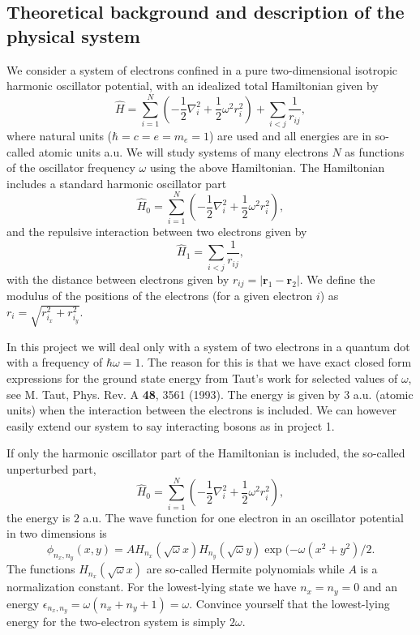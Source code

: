 \documentclass[%
oneside,                 %
final,                   %
10pt]{article}
\begin{document}
\subsection*{Theoretical background and description of the physical system}

We consider a system of electrons confined in a pure two-dimensional 
isotropic harmonic oscillator potential, with an idealized  total Hamiltonian given by
\begin{equation}
\label{eq:finalH}
\hat{H}=\sum_{i=1}^{N} \left(  -\frac{1}{2} \nabla_i^2 + \frac{1}{2} \omega^2r_i^2  \right)+\sum_{i<j}\frac{1}{r_{ij}},
\end{equation}
where natural units ($\hbar=c=e=m_e=1$) are used and all energies are in so-called atomic units a.u. We will study systems of many electrons $N$ as functions of the oscillator frequency  $\omega$ using the above Hamiltonian.  The Hamiltonian includes a standard harmonic oscillator part
\begin{equation*}
\hat{H}_0=\sum_{i=1}^{N} \left(  -\frac{1}{2} \nabla_i^2 + \frac{1}{2} \omega^2r_i^2  \right),
\end{equation*}
and the repulsive interaction between two electrons given by
\begin{equation*}
\hat{H}_1=\sum_{i<j}\frac{1}{r_{ij}},
\end{equation*}
with the distance between electrons given by $r_{ij}=\vert \bm{r}_1-\bm{r}_2\vert$. We define the 
modulus of the positions of the electrons (for a given electron $i$) as $r_i = \sqrt{r_{i_x}^2+r_{i_y}^2}$.

In this project  we will deal only with a system of
two electrons in a quantum dot with a frequency of $\hbar\omega = 1$. 
The reason for this is that we have exact closed form expressions 
for the ground state energy from Taut's work for selected values of $\omega$, 
see M. Taut, Phys. Rev. A \textbf{48}, 3561 (1993).
The energy is given by $3$ a.u.  (atomic units) when the interaction between the electrons is included. We can however easily extend our system to say interacting bosons as in project 1.

If only the harmonic oscillator part of the Hamiltonian is included,
the so-called unperturbed part,
\begin{equation*} 
\hat{H}_0=\sum_{i=1}^{N} \left(  -\frac{1}{2} \nabla_i^2 + \frac{1}{2} \omega^2r_i^2  \right),
\end{equation*}
the energy is $2$ a.u.
The wave function for one electron in an oscillator potential in two dimensions is
\begin{equation*}
\phi_{n_x,n_y}(x,y) = A H_{n_x}(\sqrt{\omega}x)H_{n_y}(\sqrt{\omega}y)\exp{(-\omega(x^2+y^2)/2}.
\end{equation*}
The functions $H_{n_x}(\sqrt{\omega}x)$ are so-called Hermite polynomials  while $A$ is a normalization constant. 
For the lowest-lying state we have $n_x=n_y=0$ and an energy $\epsilon_{n_x,n_y}=\omega(n_x+n_y+1) = \omega$.
Convince yourself that the lowest-lying energy for the two-electron system  is simply $2\omega$.
\end{document}
